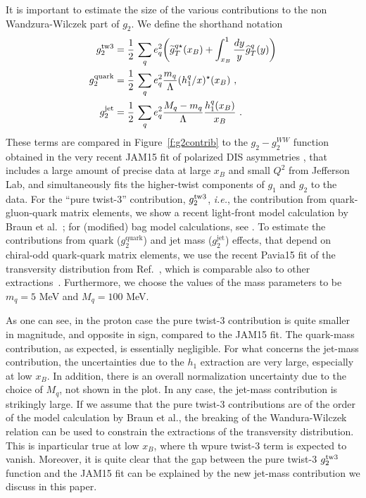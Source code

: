 \documentclass[preprintnumbers,floatfix,nofootinbib]{revtex4}
\newcommand{\xbj}{{x_B}}                   %
\newcommand{\mj}{M_q}
\newcommand{\mq}{m_q}
\begin{document}
It is important to estimate the size of the various contributions to the non Wandzura-Wilczek part of $g_2$. We define the shorthand notation
\begin{align}
g_2^{\rm tw3} & = \frac{1}{2}\,\sum_q e_q^2
    \biggl(
    \widetilde g_T^{q \star}(\xbj) 
    + \int_\xbj^1\frac{dy}{y} \widehat{g}_T^q(y) 
    \biggr) 
\nonumber \\ 
g_2^{\text{quark}} &= \frac{1}{2}\,\sum_q e_q^2 
 \frac{\mq}{\Lambda} (h_1^q/x)^\star(\xbj) \ ,
\\
g_2^{\text{jet}} &= \frac{1}{2}\,\sum_q e_q^2 
\frac{\mj-\mq}{\Lambda} \frac{h_1^q(\xbj)}{\xbj} \ .
\nonumber 
\end{align} 
These terms are compared in Figure~\ref{f:g2contrib} to the $g_2-g_2^{WW}$ function obtained in the very recent JAM15 fit of polarized DIS asymmetries
\cite{Sato:2016tuz}, that includes a large amount of precise data at large $\xbj$ and small $Q^2$ from Jefferson Lab, and simultaneously fits the higher-twist components of
$g_1$ and $g_2$ to the data. For the ``pure twist-3'' contribution,
$g_2^{\rm tw3}$, {\it i.e.}, the contribution from quark-gluon-quark matrix
elements, we show a recent light-front model calculation by Braun et al.~\cite{Braun:2011aw}; for
(modified) bag model calculations, see \cite{Jaffe:1990qh,Stratmann:1993aw}. To estimate the contributions
from quark ($g_2^{\text{quark}}$) and jet mass ($g_2^{\text{jet}}$) effects, that depend on chiral-odd quark-quark matrix elements, we use the recent Pavia15 fit of the
transversity distribution from Ref.~\cite{Radici:2015mwa}, which is comparable
also to other 
extractions~\cite{Anselmino:2013vqa,Kang:2015msa}. Furthermore, we choose the
values of the mass parameters to be $\mq=5$ MeV and $\mj = 100$ MeV. 

As one can see, in the proton case the pure twist-3 contribution is quite
smaller in magnitude, and opposite in sign, compared to the JAM15 fit. The quark-mass contribution, as expected, is essentially negligible. 
For what concerns the jet-mass contribution, the uncertainties due to the $h_1$
extraction are very large, especially at low $\xbj$. In addition, there is an
overall normalization uncertainty due to the choice of $\mj$, not shown in the
plot. In any case, the jet-mass contribution is strikingly large. If we assume
that the pure twist-3 contributions are of the order of the model calculation
by Braun et al., the breaking of the Wandura-Wilczek relation can be used to
constrain the extractions of the transversity distribution. This is inparticular true at low $\xbj$, where th wpure twist-3 term is expected to vanish. 
Moreover, it is quite clear that the gap
between the pure twist-3 $g_2^{\rm tw3}$ function and the JAM15 fit can be
explained by the new jet-mass contribution we discuss in this paper.  
\end{document}
